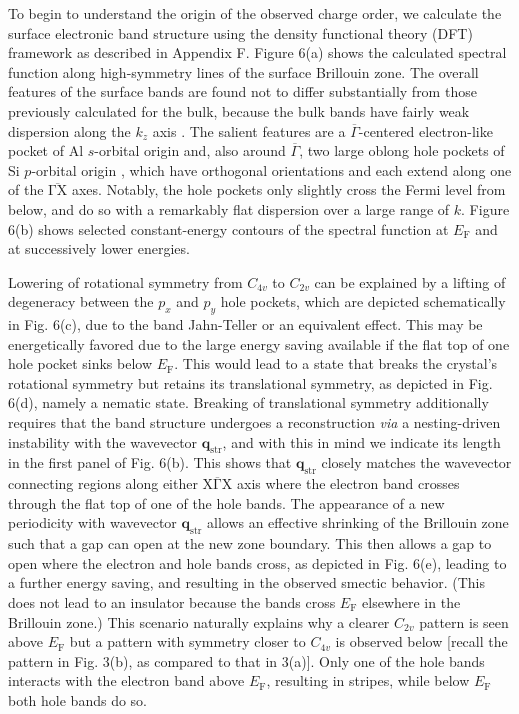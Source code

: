 \documentclass[reprint,superscriptaddress,prb,aps]{revtex4-2}
\begin{document}
To begin to understand the origin of the observed charge order, we calculate the surface electronic band structure using the density functional theory (DFT) framework as described in Appendix F. Figure 6(a) shows the calculated spectral function along high-symmetry lines of the surface Brillouin zone. The overall features of the surface bands are found not to differ substantially from those previously calculated for the bulk, because the bulk bands have fairly weak dispersion along the $k_{z}$ axis \cite{Rhee2010,Muechler2019}. The salient features are a $\overline{\Gamma}$-centered electron-like pocket of Al $s$-orbital origin and, also around $\overline{\Gamma}$, two large oblong hole pockets of Si $p$-orbital origin \cite{Rhee2010,Yi2019,Muechler2019}, which have orthogonal orientations and each extend along one of the $\overline{\mathrm{\Gamma X}}$ axes. Notably, the hole pockets only slightly cross the Fermi level from below, and do so with a remarkably flat dispersion over a large range of $k$. Figure 6(b) shows selected constant-energy contours of the spectral function at $E_{\mathrm{F}}$ and at successively lower energies.

Lowering of rotational symmetry from $C_{4v}$ to $C_{2v}$ can be explained by a lifting of degeneracy between the $p_{x}$ and $p_{y}$ hole pockets, which are depicted schematically in Fig. 6(c), due to the band Jahn-Teller or an equivalent effect. This may be energetically favored due to the large energy saving available if the flat top of one hole pocket sinks below $E_{\mathrm{F}}$. This would lead to a state that breaks the crystal's rotational symmetry but retains its translational symmetry, as depicted in Fig. 6(d), namely a nematic state. Breaking of translational symmetry additionally requires that the band structure undergoes a reconstruction \textit{via} a nesting-driven instability with the wavevector $\mathbf{q}_{\mathrm{str}}$, and with this in mind we indicate its length in the first panel of Fig. 6(b). This shows that $\mathbf{q}_{\mathrm{str}}$ closely matches the wavevector connecting regions along either $\overline{\mathrm{X \Gamma X}}$ axis where the electron band crosses through the flat top of one of the hole bands. The appearance of a new periodicity with wavevector $\mathbf{q}_{\mathrm{str}}$ allows an effective shrinking of the Brillouin zone such that a gap can open at the new zone boundary. This then allows a gap to open where the electron and hole bands cross, as depicted in Fig. 6(e), leading to a further energy saving, and resulting in the observed smectic behavior. (This does not lead to an insulator because the bands cross $E_{\mathrm{F}}$ elsewhere in the Brillouin zone.) This scenario naturally explains why a clearer $C_{2v}$ pattern is seen above $E_{\mathrm{F}}$ but a pattern with symmetry closer to $C_{4v}$ is observed below [recall the pattern in Fig. 3(b), as compared to that in 3(a)]. Only one of the hole bands interacts with the electron band above $E_{\mathrm{F}}$, resulting in stripes, while below $E_{\mathrm{F}}$ both hole bands do so.
\end{document}
